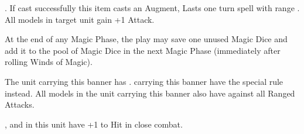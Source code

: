  . If cast successfully this item
casts an Augment, Lasts one turn spell with range . All \undead{} models in target unit gain +1 Attack.

 At the end of any Magic Phase, the play may save one unused Magic Dice and add it to the pool of Magic Dice in the next Magic Phase (immediately after rolling Winds of Magic).

\endpricelist

\armymagicbanners

\startpricelist

 The unit carrying this banner has \bodyguard{\vampirelord , \vampirehero}. \vampireknights{} carrying this banner have the \stubborn{} special rule instead. All models in the unit carrying this banner also have  against all Ranged Attacks.

 \barrowknights , \barrowguards{} and \barrowkings{} in this unit have +1 to Hit in close combat.

\endpricelist







\armylist

\lordstitle


